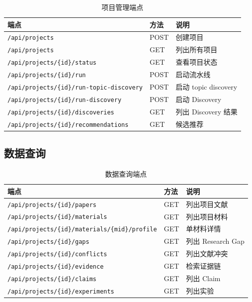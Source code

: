\documentclass[11pt,a4paper]{article}
\begin{document}
\begin{table}[h]
\centering
\small
\caption{项目管理端点}
\begin{tabular}{@{}p{6cm}p{2.5cm}p{5cm}@{}}
\toprule
\textbf{端点} & \textbf{方法} & \textbf{说明} \\
\midrule
\texttt{/api/projects} & POST & 创建项目 \\
\texttt{/api/projects} & GET & 列出所有项目 \\
\texttt{/api/projects/\{id\}/status} & GET & 查看项目状态 \\
\texttt{/api/projects/\{id\}/run} & POST & 启动流水线 \\
\texttt{/api/projects/\{id\}/run-topic-discovery} & POST & 启动 topic discovery \\
\texttt{/api/projects/\{id\}/run-discovery} & POST & 启动 Discovery \\
\texttt{/api/projects/\{id\}/discoveries} & GET & 列出 Discovery 结果 \\
\texttt{/api/projects/\{id\}/recommendations} & GET & 候选推荐 \\
\bottomrule
\end{tabular}
\end{table}

\subsection{数据查询}

\begin{table}[h]
\centering
\small
\caption{数据查询端点}
\begin{tabular}{@{}p{6cm}p{2.5cm}p{5cm}@{}}
\toprule
\textbf{端点} & \textbf{方法} & \textbf{说明} \\
\midrule
\texttt{/api/projects/\{id\}/papers} & GET & 列出项目文献 \\
\texttt{/api/projects/\{id\}/materials} & GET & 列出项目材料 \\
\texttt{/api/projects/\{id\}/materials/\{mid\}/profile} & GET & 单材料详情 \\
\texttt{/api/projects/\{id\}/gaps} & GET & 列出 Research Gap \\
\texttt{/api/projects/\{id\}/conflicts} & GET & 列出文献冲突 \\
\texttt{/api/projects/\{id\}/evidence} & GET & 检索证据链 \\
\texttt{/api/projects/\{id\}/claims} & GET & 列出 Claim \\
\texttt{/api/projects/\{id\}/experiments} & GET & 列出实验 \\
\bottomrule
\end{tabular}
\end{table}
\end{document}

